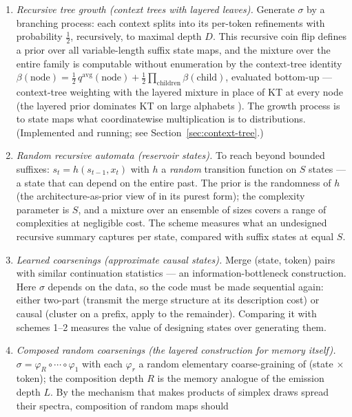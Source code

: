 \documentclass[11pt]{article}
\begin{document}
\begin{enumerate}
\item \emph{Recursive tree growth (context trees with layered leaves).}
  Generate $\sigma$ by a branching process: each context splits into its
  per-token refinements with probability $\tfrac12$, recursively, to
  maximal depth $D$.  This recursive coin flip defines a prior over all
  variable-length suffix state maps, and the mixture over the entire
  family is computable without enumeration by the context-tree identity
  $\beta(\mathrm{node}) = \tfrac12\, q^{\mathrm{avg}}(\mathrm{node}) +
  \tfrac12 \prod_{\mathrm{children}} \beta(\mathrm{child})$, evaluated
  bottom-up --- context-tree weighting with the layered mixture in place
  of KT at every node (the layered prior dominates KT on large
  alphabets \cite{layered2026}).  The growth process
  is to state maps what coordinatewise multiplication is to
  distributions.  (Implemented and running; see
  Section~\ref{sec:context-tree}.)
\item \emph{Random recursive automata (reservoir states).}  To reach
  beyond bounded suffixes: $s_t = h(s_{t-1}, x_t)$ with $h$ a
  \emph{random} transition function on $S$ states --- a state that can
  depend on the entire past.  The prior is the randomness of $h$ (the
  architecture-as-prior view of \cite{layered2026} in its purest form);
  the complexity parameter is $S$, and a mixture over an ensemble of
  sizes covers a range of complexities at negligible cost.  The scheme
  measures what an undesigned recursive summary captures per state,
  compared with suffix states at equal $S$.
\item \emph{Learned coarsenings (approximate causal states).}  Merge
  (state, token) pairs with similar continuation statistics --- an
  information-bottleneck construction.  Here $\sigma$ depends on the
  data, so the code must be made sequential again: either two-part
  (transmit the merge structure at its description cost) or causal
  (cluster on a prefix, apply to the remainder).  Comparing it with
  schemes 1--2 measures the value of designing states over generating
  them.
\item \emph{Composed random coarsenings (the layered construction for
  memory itself).}  $\sigma = \varphi_R \circ \cdots \circ \varphi_1$
  with each $\varphi_r$ a random elementary coarse-graining of (state
  $\times$ token); the composition depth $R$ is the memory analogue of
  the emission depth $L$.  By the mechanism that makes products of
  simplex draws spread their spectra, composition of random maps should

\end{enumerate}
\end{document}
